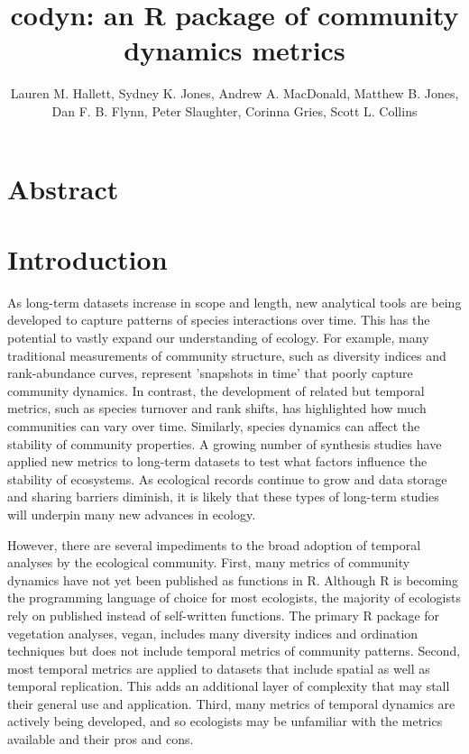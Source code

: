 \documentclass[11pt]{article}
\title{codyn: an R package of community dynamics metrics}
\author{Lauren M. Hallett, Sydney K. Jones,  Andrew A. MacDonald,  
	Matthew B. Jones, Dan F. B. Flynn, Peter Slaughter, Corinna Gries, Scott L. Collins}
\date{}
\begin{document}
\maketitle

\section{Abstract}

\section{Introduction}
As long-term datasets increase in scope and length, new analytical tools are being developed to capture patterns of species interactions over time. This has the potential to vastly expand our understanding of ecology. For example, many traditional measurements of community structure, such as diversity indices and rank-abundance curves, represent 'snapshots in time' that poorly capture community dynamics. In contrast, the development of related but temporal metrics, such as species turnover and rank shifts, has highlighted how much communities can vary over time. Similarly, species dynamics can affect the stability of community properties. A growing number of synthesis studies have applied new metrics to long-term datasets to test what factors influence the stability of ecosystems. As ecological records continue to grow and data storage and sharing barriers diminish, it is likely that these types of long-term studies will underpin many new advances in ecology.

However, there are several impediments to the broad adoption of temporal analyses by the ecological community. First, many metrics of community dynamics have not yet been published as functions in R. Although R is becoming the programming language of choice for most ecologists, the majority of ecologists rely on published instead of self-written functions. The primary R package for vegetation analyses, vegan, includes many diversity indices and ordination techniques but does not include temporal metrics of community patterns. Second, most temporal metrics are applied to datasets that include spatial as well as temporal replication. This adds an additional layer of complexity that may stall their general use and application. Third, many metrics of temporal dynamics are actively being developed, and so ecologists may be unfamiliar with the metrics available and their pros and cons.
\end{document}
